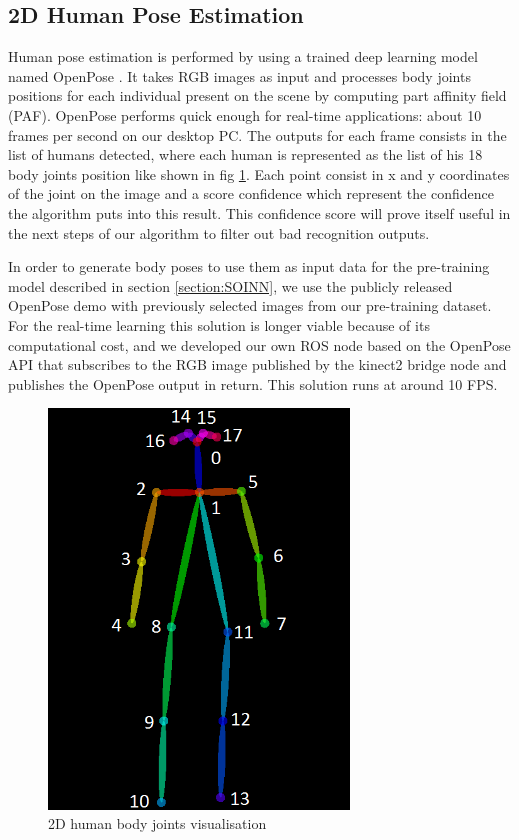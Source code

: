 \subsection{2D Human Pose Estimation}
\label{section:openpose}
Human pose estimation is performed by using a trained deep learning model named OpenPose \cite{Openpose}. It takes RGB images as input and processes body joints positions for each individual present on the scene by computing part affinity field (PAF). OpenPose performs quick enough for real-time applications: about 10 frames per second on our desktop PC. The outputs for each frame consists in the list of humans detected, where each human is represented as the list of his 18 body joints position like shown in fig \ref{fig:2D_joints_vis}. Each point consist in x and y coordinates of the joint on the image and a score confidence which represent the confidence the algorithm puts into this result. This confidence score will prove itself useful in the next steps of our algorithm to filter out bad recognition outputs.

In order to generate body poses to use them as input data for the pre-training model described in section \ref{section:SOINN}, we use the publicly released OpenPose demo with previously selected images from our pre-training dataset. For the real-time learning this solution is longer viable because of its computational cost, and we developed our own ROS node based on the OpenPose API that subscribes to the RGB image published by the kinect2 bridge node and publishes the OpenPose output in return. This solution runs at around 10 FPS.

\begin{figure}[ht]
    \centering
    \includegraphics[width=80mm, keepaspectratio]{images/2D_body_joints_visualisation.png}
    \caption{2D human body joints visualisation}
    \label{fig:2D_joints_vis}
\end{figure}

